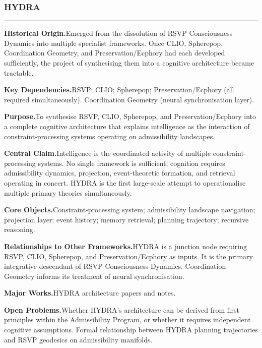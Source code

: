 \documentclass[12pt, twoside]{article}
\newcommand{\frameworkhead}[5]{  \subsubsection{#1}
  \noindent\textcolor{#2}{\rule{\linewidth}{0.8pt}}
  \smallskip

  \noindent\textbf{Historical Origin.}\quad #3

  \noindent\textbf{Key Dependencies.}\quad #4

  \noindent\textbf{Purpose.}\quad #5
}
\newcommand{\frameworkbody}[5]{  \noindent\textbf{Central Claim.}\quad #1

  \noindent\textbf{Core Objects.}\quad #2

  \noindent\textbf{Relationships to Other Frameworks.}\quad #3

  \noindent\textbf{Major Works.}\quad #4

  \noindent\textbf{Open Problems.}\quad #5
  \medskip
}
\begin{document}
\frameworkhead{HYDRA}{integgold}{Emerged from the dissolution of RSVP Consciousness Dynamics into multiple
specialist frameworks. Once CLIO, Spherepop, Coordination Geometry, and
Preservation/Ecphory had each developed sufficiently, the project of
synthesising them into a cognitive architecture became tractable.}{RSVP; CLIO; Spherepop; Preservation/Ecphory (all required simultaneously).
Coordination Geometry (neural synchronisation layer).}{To synthesise RSVP, CLIO, Spherepop, and Preservation/Ecphory into a
complete cognitive architecture that explains intelligence as the interaction
of constraint-processing systems operating on admissibility landscapes.}
\frameworkbody{Intelligence is the coordinated activity of multiple constraint-processing
systems. No single framework is sufficient; cognition requires admissibility
dynamics, projection, event-theoretic formation, and retrieval operating in
concert. HYDRA is the first large-scale attempt to operationalise multiple
primary theories simultaneously.}{Constraint-processing system; admissibility landscape navigation; projection
layer; event history; memory retrieval; planning trajectory; recursive
reasoning.}{HYDRA is a junction node requiring RSVP, CLIO, Spherepop, and
Preservation/Ecphory as inputs. It is the primary integrative descendant of
RSVP Consciousness Dynamics. Coordination Geometry informs its treatment of
neural synchronisation.}{HYDRA architecture papers and notes.}{Whether HYDRA's architecture can be derived from first principles within the
Admissibility Program, or whether it requires independent cognitive
assumptions. Formal relationship between HYDRA planning trajectories and RSVP
geodesics on admissibility manifolds.}
\end{document}
